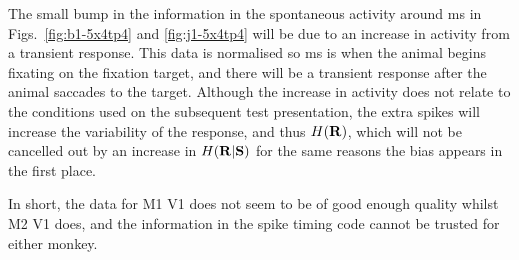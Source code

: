 The small bump in the information in the spontaneous activity around \unit[50]{ms} in Figs.~\ref{fig:b1-5x4tp4} and \ref{fig:j1-5x4tp4} will be due to an increase in activity from a transient response. This data is normalised so \unit[0]{ms} is when the animal begins fixating on the fixation target, and there will be a transient response after the animal saccades to the target. Although the increase in activity does not relate to the conditions used on the subsequent test presentation, the extra spikes will increase the variability of the response, and thus $H(\mathbf{R})$, which will not be cancelled out by an increase in $H(\mathbf{R}|\mathbf{S})$ for the same reasons the bias appears in the first place.

In short, the data for \ac{M1} \ac{V1} does not seem to be of good enough quality whilst \ac{M2} \ac{V1} does, and the information in the spike timing code cannot be trusted for either monkey.



